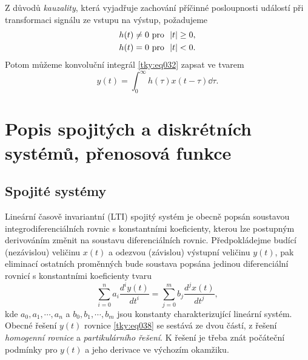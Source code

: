       Z důvodů \emph{kauzality}, která vyjadřuje zachování příčinné posloupnosti událostí při 
      transformaci signálu ze vstupu na výstup, požadujeme
      \begin{align}\label{tky:eq036}
        h(t) &\neq  0 \text{   pro } \abs{t} \geq0, \\
        h(t) &  =   0 \text{   pro } \abs{t} < 0. 
      \end{align}    
      Potom můžeme konvoluční integrál \ref{tky:eq032} zapsat ve tvarem
      \begin{equation}\label{tky:eq037}
         y(t) = \int_0^{\infty}h(\tau)x(t-\tau)\dd\tau.
      \end{equation} 
  
  \section{Popis spojitých a diskrétních systémů, přenosová funkce}\label{tky:IchIIsecIII}
    \subsection{Spojité systémy}\label{tky:IchIIsecIIIssecI}
      Lineární časově invariantní (LTI) spojitý systém je obecně popsán soustavou
      integrodiferenciálních rovnic s konstantními koeficienty, kterou lze postupným derivováním
      změnit na soustavu diferenciálních rovnic. Předpokládejme budící (nezávislou) veličinu
      $x(t)$ a odezvou (závislou) výstupní veličinu $y(t)$, pak eliminací ostatních proměnných bude
      soustava popsána jedinou diferenciální rovnicí s konstantními koeficienty tvaru
      \begin{equation}\label{tky:eq038}
          \sum_{i=0}^na_i\frac{d^iy(t)}{dt^i}=\sum_{j=0}^mb_j\frac{d^jx(t)}{dt^j},
      \end{equation}
      kde $a_0, a_1, \cdots ,a_n$ a $b_0, b_1, \cdots ,b_m$ jsou konstanty charakterizující lineární
      systém. Obecné řešení $y(t)$ rovnice \ref{tky:eq038} se sestává ze dvou částí, z 
      řešení \emph{homogenní rovnice} a \emph{partikulárního řešení}. K řešení je třeba znát 
      počáteční podmínky pro $y(t)$ a jeho derivace ve výchozím okamžiku.
  
